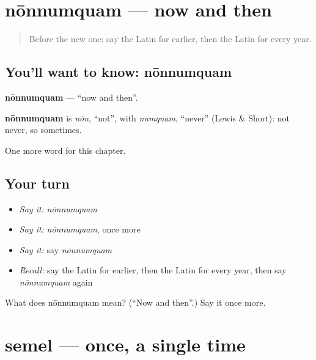 \section[nōnnumquam]{nōnnumquam — now and then}

\label{lesson:LA-C176-nonnumquam}



\begin{quote}
Before the new one: say the Latin for earlier, then the Latin for every year.
\end{quote}

\subsection*{You'll want to know: nōnnumquam}
\textbf{nōnnumquam} — \textquotedblleft{}now and then\textquotedblright{}.

\begin{cousinweb}
\textbf{nōnnumquam} is \emph{nōn}, \textquotedblleft{}not\textquotedblright{}, with \emph{numquam}, \textquotedblleft{}never\textquotedblright{} (Lewis \& Short): not never, so sometimes.
\end{cousinweb}

\begin{grammarlens}[title={What you've built}]
One more word for this chapter.
\end{grammarlens}

\subsection*{Your turn}
\begin{itemize}
\raggedright
  \item \emph{Say it:} \emph{nōnnumquam}
  \item \emph{Say it:} \emph{nōnnumquam}, once more
  \item \emph{Say it:} say \emph{nōnnumquam}
  \item \emph{Recall:} say the Latin for earlier, then the Latin for every year, then say \emph{nōnnumquam} again
\end{itemize}

\begin{tcolorbox}[breakable,colback=teal!4,colframe=teal!35!black,title={Before you move on}]
What does nōnnumquam mean? (\textquotedblleft{}Now and then\textquotedblright{}.) Say it once more.
\end{tcolorbox}
\section[semel]{semel — once, a single time}

